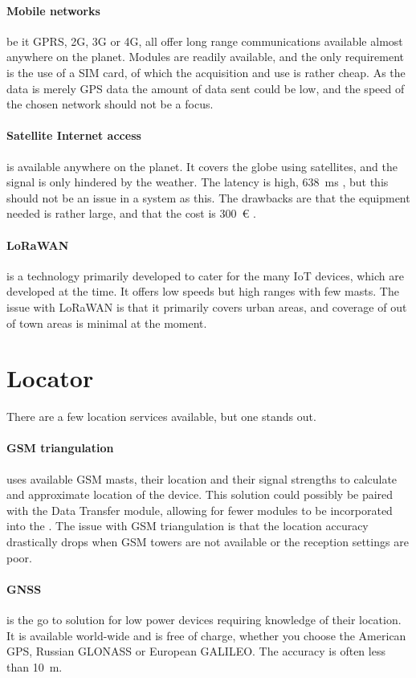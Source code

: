 \paragraph{Mobile networks} be it GPRS, 2G, 3G or 4G, all offer long range communications available almost anywhere on the planet.
Modules are readily available, and the only requirement is the use of a SIM card, of which the acquisition and use is rather cheap.
As the data is merely GPS data the amount of data sent could be low, and the speed of the chosen network should not be a focus.
\paragraph{Satellite Internet access} is available anywhere on the planet.
It covers the globe using satellites, and the signal is only hindered by the weather.
The latency is high, \SI{638}{\milli\second} \cite{wiki:satellite}, but this should not be an issue in a system as this.
The drawbacks are that the equipment needed is rather large, and that the cost is \SI{300}{€} \cite{wiki:satellite}.
\paragraph{LoRaWAN} is a technology primarily developed to cater for the many IoT devices, which are developed at the time.
It offers low speeds but high ranges with few masts.
The issue with LoRaWAN is that it primarily covers urban areas, and coverage of out of town areas is minimal at the moment.

\section{Locator}
There are a few location services available, but one stands out.
\paragraph{GSM triangulation} uses available GSM masts, their location and their signal strengths to calculate and approximate location of the device.
This solution could possibly be paired with the Data Transfer module, allowing for fewer modules to be incorporated into the \systemName.
The issue with GSM triangulation is that the location accuracy drastically drops when GSM towers are not available or the reception settings are poor.
\paragraph{GNSS} is the go to solution for low power devices requiring knowledge of their location.
It is available world-wide and is free of charge, whether you choose the American GPS, Russian GLONASS or European GALILEO.
The accuracy is often less than \SI{10}{\metre}.

